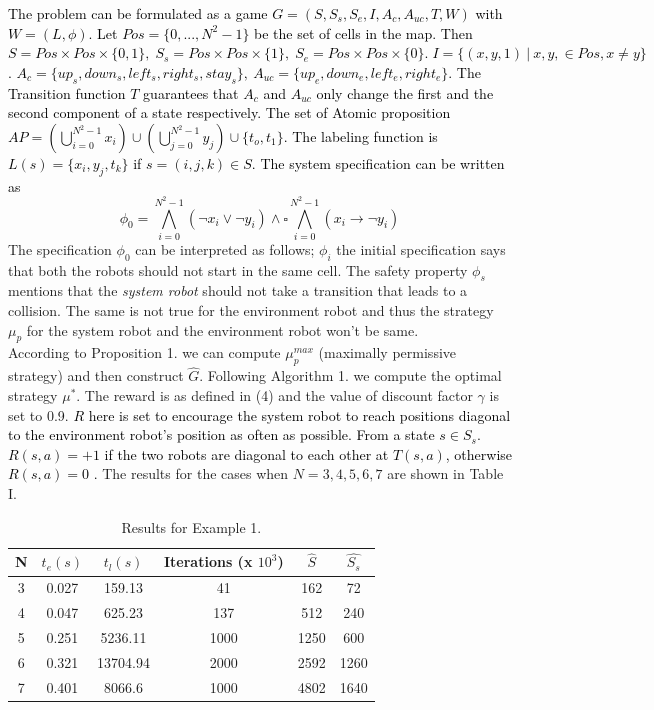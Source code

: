 \documentclass[letterpaper, 10 pt, conference]{ieeeconf}  %
\begin{document}
\textcolor{black}{The problem can be formulated as a game $G = (S, S_s, S_e, I, A_c, A_{uc}, T, W)$ with $W = (L, \phi)$. Let $Pos = \{0,...,N^2 - 1\}$ be the set of cells in the map. Then $S = Pos \times Pos \times \{0, 1\},\; S_s = Pos \times Pos \times \{1\},\; S_e = Pos \times Pos \times \{0\}.\; I = \{(x, y, 1)\: \vert\: x, y, \in Pos, x \not= y\}$. $A_c = \{up_s, down_s, left_s, right_s, stay_s\},\: A_{uc} = \{up_e, down_e, left_e, right_e \}$. The Transition function $T$ guarantees that $A_c$ and $A_{uc}$ only change the first and the second component of a state respectively. The set of Atomic proposition $AP = (\bigcup_{i=0}^{N^2 -1} x_i) \cup  (\bigcup_{j=0}^{N^2 -1} y_j) \cup \{t_o, t_1\}$. The labeling function is $L(s)= \{x_i, y_j, t_k\}$ if $s = (i, j, k) \in S.$ The system specification can be written as }
\textcolor{black}{
\begin{equation}
    \phi_0 = \bigwedge_{i=0}^{N^2 -1}(\neg x_i \vee \neg y_i) \wedge \square \bigwedge_{i=0}^{N^2 -1} (x_i \rightarrow \neg y_i)    
\end{equation}
}
The specification $\phi_0$ can be interpreted as follows; $\phi_i$ the initial specification says that both the robots should not start in the same cell. The safety property $\phi_s$ mentions that the \textit{system robot} should not take a transition that leads to a collision. The same is not true for the environment robot and thus the strategy $\mu_p$ for the system robot and the environment robot won't be same.\\ 

According to Proposition 1. we can compute $\mu_p^{max}$ (maximally permissive strategy) and then construct $\hat{G}$. Following Algorithm 1. we compute the optimal strategy $\mu^*$. The reward is as defined in (4) and the value of discount factor $\gamma$ is set to 0.9. \textcolor{black} {$R$ here is set to encourage the system robot to reach positions diagonal to the environment robot’s position as often as possible. From a state $s \in S_s$.\: $R(s, a) = +1$ if the two robots are diagonal to each other at $T(s, a)$, otherwise $R(s, a) = 0$ .} The results for the cases when $N = 3,4,5,6,7$ are shown in Table I.

\begin{table}[h]
\caption{Results for Example 1.}
\label{table_example}
\begin{center}
\begin{tabular}{|c|c|c|c|c|c|}
\hline
N & $t_e(s)$ & $t_l(s)$ & Iterations (x $10^3$) & $\hat{S}$ & $\hat{S_s}$ \\
\hline
3 & 0.027 & 159.13 & 41 & 162 & 72\\
\hline
4 & 0.047 & 625.23 & 137 & 512 & 240\\
\hline
5 & 0.251 & 5236.11 & 1000 & 1250 & 600\\
\hline
6 & 0.321 & 13704.94 & 2000 & 2592 & 1260\\
\hline
7 & 0.401 & 8066.6 & 1000 & 4802 & 1640\\
\hline
\end{tabular}
\end{center}
\end{table}
\end{document}
